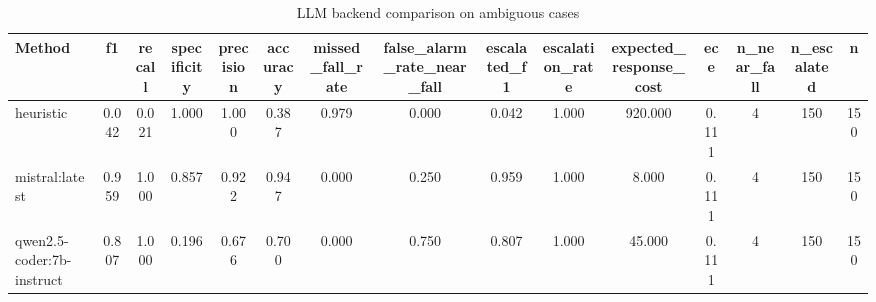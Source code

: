 \begin{table}[t]
\centering
\caption{LLM backend comparison on ambiguous cases}
\begin{tabular}{lcccccccccccccc}
\toprule
Method & f1 & recall & specificity & precision & accuracy & missed_fall_rate & false_alarm_rate_near_fall & escalated_f1 & escalation_rate & expected_response_cost & ece & n_near_fall & n_escalated & n \\
\midrule
heuristic & 0.042 & 0.021 & 1.000 & 1.000 & 0.387 & 0.979 & 0.000 & 0.042 & 1.000 & 920.000 & 0.111 & 4 & 150 & 150 \\
mistral:latest & 0.959 & 1.000 & 0.857 & 0.922 & 0.947 & 0.000 & 0.250 & 0.959 & 1.000 & 8.000 & 0.111 & 4 & 150 & 150 \\
qwen2.5-coder:7b-instruct & 0.807 & 1.000 & 0.196 & 0.676 & 0.700 & 0.000 & 0.750 & 0.807 & 1.000 & 45.000 & 0.111 & 4 & 150 & 150 \\
\bottomrule
\end{tabular}
\end{table}